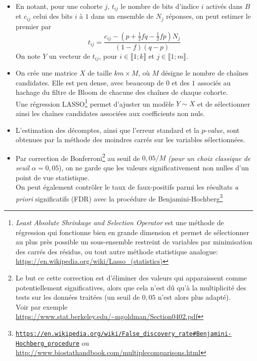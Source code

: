\documentclass[a4paper,11pt]{article} %
\newcommand{\www}[2]{\href{#1}{\nolinkurl{#2}}}
\begin{document}
\begin{itemize}
    \item 
    En notant, pour une cohorte $j$, $t_{ij}$ le nombre de bits d'indice $i$ activés dans $B$ et $c_{ij}$ celui des bits $i$ à $1$ dans un ensemble de $N_j$ réponses, on peut estimer le premier par 
    \[t_{ij} = \frac{c_{ij} - (p+\frac{1}{2}fq-\frac{1}{2}fp)N_j}{(1-f)(q-p)}\]
    On note $Y$ un vecteur de $t_{ij}$, pour $i\in\llbracket1;k\rrbracket$ et $j\in \llbracket1;m\rrbracket$.
    \item 
    On crée une matrice $X$ de taille $km\times M$, où $M$ désigne le nombre de chaînes candidates. Elle est peu dense, avec beaucoup de $0$ et des $1$ associés au hachage du filtre de Bloom de chacune des chaînes de chaque cohorte.\\
    Une régression LASSO\footnote{\emph{Least Absolute Shrinkage and Selection Operator} est une méthode de régression qui fonctionne bien en grande dimension et permet de sélectionner au plus près possible un sous-ensemble restreint de variables par minimisation des carrés des résidus, ou tout autre méthode statistique analogue: \url{https://en.wikipedia.org/wiki/Lasso\_(statistics)}} permet d'ajuster un modèle $Y \sim X$ et de sélectionner ainsi les chaînes candidates associées aux coefficients non nuls. 
    \item 
    L'estimation des décomptes, ainsi que l'erreur standard et la $p$-\emph{value}, sont obtenues par la méthode des moindres carrés sur les variables sélectionnées.
    \item 
    Par correction de Bonferroni\footnote{Le but ce cette correction est d'éliminer des valeurs qui apparaissent comme potentiellement significatives, alors que cela n'est dû qu'à la multiplicité des tests sur les données traitées (un seuil de $0,05$ n'est alors plus adapté).\\Voir par exemple \url{https://www.stat.berkeley.edu/\~mgoldman/Section0402.pdf}} au seuil de $0,05/M$ \emph{(pour un choix classique de seuil} $\alpha=0,05$), on ne garde que les valeurs significativement non nulles d'un point de vue statistique.\\
    On peut également contrôler le taux de faux-positifs parmi les résultats \textit{a priori} significatifs (FDR) avec la procédure de Benjamini-Hochberg\footnote{\www{https://en.wikipedia.org/wiki/False\_discovery\_rate\#Benjamini\%E2\%80\%93Hochberg_procedure}{https://en.wikipedia.org/wiki/False\_discovery\_rate\#Benjamini-Hochberg\_procedure} ou \url{http://www.biostathandbook.com/multiplecomparisons.html}}
\end{itemize} 
%
\end{document}
